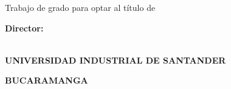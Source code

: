 \begin{titlepage}
\thispagestyle{empty}
\begin{center}
\vspace*{0.8cm}
{\Large\bfseries\MakeUppercase{\Title}\par}

\vfill

{\Large\bfseries\MakeUppercase{\Author}\par}

\vfill

Trabajo de grado para optar al título de\\
\DegreeName

\vfill

\textbf{Director:}\\
\DirectorName\\
\DirectorDegree

\vfill

{\large\bfseries UNIVERSIDAD INDUSTRIAL DE SANTANDER\par}
{\large\bfseries\MakeUppercase{\FacultyName}\par}
{\large\bfseries\MakeUppercase{\SchoolName}\par}
{\large\bfseries BUCARAMANGA\par}
{\large\bfseries\ThesisYear\par}
\end{center}
\end{titlepage}
